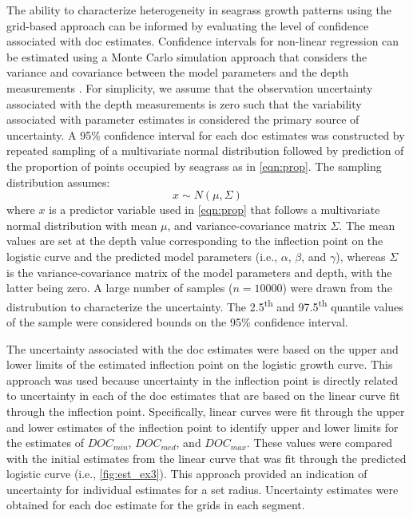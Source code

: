 \documentclass[letterpaper,12pt,oneside]{article}\usepackage[]{graphicx}\usepackage[]{color}
\begin{document}
The ability to characterize heterogeneity in seagrass growth patterns using the grid-based approach can be informed by evaluating the level of confidence associated with \ac{doc} estimates.  Confidence intervals for non-linear regression can be estimated using a Monte Carlo simulation approach that considers the variance and covariance between the model parameters and the depth measurements \citep{Hilborn97}.  For simplicity, we assume that the observation uncertainty associated with the depth measurements is zero such that the variability associated with parameter estimates is considered the primary source of uncertainty.  A 95\% confidence interval for each \ac{doc} estimates was constructed by repeated sampling of a multivariate normal distribution followed by prediction of the proportion of points occupied by seagrass as in \cref{eqn:prop}.  The sampling distribution assumes:
\begin{equation}
x \sim N(\mu, \Sigma)
\end{equation}
\noindent where $x$ is a predictor variable used in \cref{eqn:prop} that follows a multivariate normal distribution with mean $\mu$, and variance-covariance matrix $\Sigma$.  The mean values are set at the depth value corresponding to the inflection point on the logistic curve and the predicted model parameters (i.e., $\alpha$, $\beta$, and $\gamma$), whereas $\Sigma$ is the variance-covariance matrix of the model parameters and depth, with the latter being zero.  A large number of samples ($n = 10000$) were drawn from the distrubution to characterize the uncertainty.  The 2.5\textsuperscript{th} and 97.5\textsuperscript{th} quantile values of the sample were considered bounds on the 95\% confidence interval.

The uncertainty associated with the \ac{doc} estimates were based on the upper and lower limits of the estimated inflection point on the logistic growth curve.  This approach was used because uncertainty in the inflection point is directly related to uncertainty in each of the \ac{doc} estimates that are based on the linear curve fit through the inflection point.   Specifically, linear curves were fit through the upper and lower estimates of the inflection point to identify upper and lower limits for the estimates of $DOC_{min}$, $DOC_{med}$, and $DOC_{max}$.  These values were compared with the initial estimates from the linear curve that was fit through the predicted logistic curve (i.e., \cref{fig:est_ex3}).  This approach provided an indication of uncertainty for individual estimates for a set radius.  Uncertainty estimates were obtained for each \ac{doc} estimate for the grids in each segment.
\end{document}
